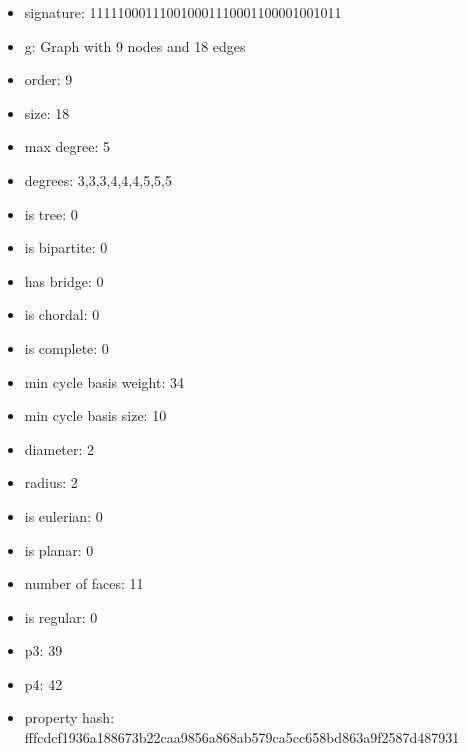 \newpage
\begin{figure}
\end{figure}
\begin{itemize}
\item signature: 111110001110010001110001100001001011
\item g: Graph with 9 nodes and 18 edges
\item order: 9
\item size: 18
\item max degree: 5
\item degrees: 3,3,3,4,4,4,5,5,5
\item is tree: 0
\item is bipartite: 0
\item has bridge: 0
\item is chordal: 0
\item is complete: 0
\item min cycle basis weight: 34
\item min cycle basis size: 10
\item diameter: 2
\item radius: 2
\item is eulerian: 0
\item is planar: 0
\item number of faces: 11
\item is regular: 0
\item p3: 39
\item p4: 42
\item property hash: fffcdcf1936a188673b22caa9856a868ab579ca5cc658bd863a9f2587d487931
\end{itemize}
